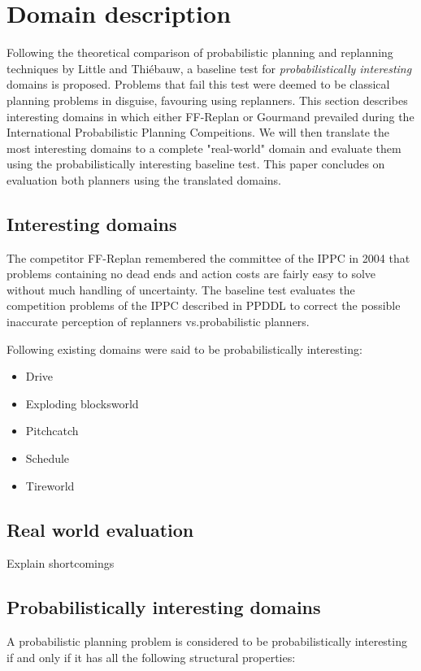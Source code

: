 \documentclass[runningheads,a4paper]{llncs}
\begin{document}

\section{Domain description}
Following the theoretical comparison of probabilistic planning and replanning techniques by Little and Thi\'ebauw, a baseline test for \emph{probabilistically interesting} domains is proposed. Problems that fail this test were deemed to be classical planning problems in disguise, favouring using replanners\cite{little2007probvsreplan}. This section describes interesting domains in which either FF-Replan or Gourmand prevailed during the International Probabilistic Planning Compeitions. We will then translate the most interesting domains to a complete "real-world" domain and evaluate them using the probabilistically interesting baseline test. This paper concludes on evaluation both planners using the translated domains.

\subsection{Interesting domains}
The competitor FF-Replan\cite{FFReplan} remembered the committee of the IPPC in 2004 that problems containing no dead ends and action costs are fairly easy to solve without much handling of uncertainty. The baseline test evaluates the competition problems of the IPPC described in PPDDL to correct the possible inaccurate perception of replanners vs.\@ probabilistic planners.

Following existing domains were said to be probabilistically interesting:
\begin{itemize}
	\item Drive
	\item Exploding blocksworld
	\item Pitchcatch
	\item Schedule
	\item Tireworld
\end{itemize}


\subsection{Real world evaluation}

Explain shortcomings


\subsection{Probabilistically interesting domains}
A probabilistic planning problem is considered to be probabilistically interesting if and only if it has all the following structural properties:
\end{document}
